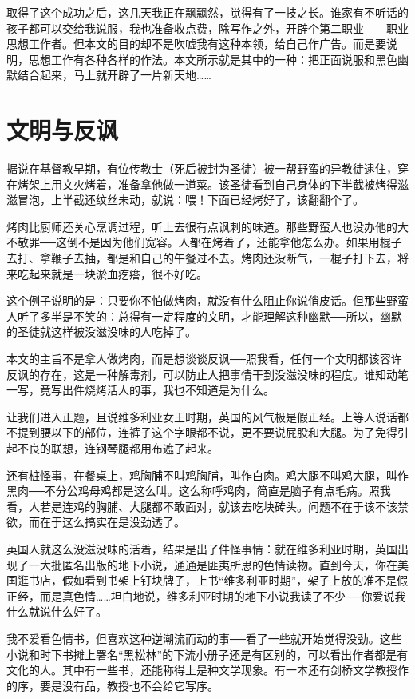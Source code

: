 取得了这个成功之后，这几天我正在飘飘然，觉得有了一技之长。谁家有不听话的孩子都可以交给我说服，我也准备收点费，除写作之外，开辟个第二职业——职业思想工作者。但本文的目的却不是吹嘘我有这种本领，给自己作广告。而是要说明，思想工作有各种各样的作法。本文所示就是其中的一种：把正面说服和黑色幽默结合起来，马上就开辟了一片新天地……

\chapter{文明与反讽}

据说在基督教早期，有位传教士（死后被封为圣徒）被一帮野蛮的异教徒逮住，穿在烤架上用文火烤着，准备拿他做一道菜。该圣徒看到自己身体的下半截被烤得滋滋冒泡，上半截还纹丝未动，就说：喂！下面已经烤好了，该翻翻个了。 

烤肉比厨师还关心烹调过程，听上去很有点讽刺的味道。那些野蛮人也没办他的大不敬罪──这倒不是因为他们宽容。人都在烤着了，还能拿他怎么办。如果用棍子去打、拿鞭子去抽，都是和自己的午餐过不去。烤肉还没断气，一棍子打下去，将来吃起来就是一块淤血疙瘩，很不好吃。 

这个例子说明的是：只要你不怕做烤肉，就没有什么阻止你说俏皮话。但那些野蛮人听了多半是不笑的：总得有一定程度的文明，才能理解这种幽默──所以，幽默的圣徒就这样被没滋没味的人吃掉了。 

本文的主旨不是拿人做烤肉，而是想谈谈反讽──照我看，任何一个文明都该容许反讽的存在，这是一种解毒剂，可以防止人把事情干到没滋没味的程度。谁知动笔一写，竟写出件烧烤活人的事，我也不知道是为什么。 

让我们进入正题，且说维多利亚女王时期，英国的风气极是假正经。上等人说话都不提到腰以下的部位，连裤子这个字眼都不说，更不要说屁股和大腿。为了免得引起不良的联想，连钢琴腿都用布遮了起来。 

还有桩怪事，在餐桌上，鸡胸脯不叫鸡胸脯，叫作白肉。鸡大腿不叫鸡大腿，叫作黑肉──不分公鸡母鸡都是这么叫。这么称呼鸡肉，简直是脑子有点毛病。照我看，人若是连鸡的胸脯、大腿都不敢面对，就该去吃块砖头。问题不在于该不该禁欲，而在于这么搞实在是没劲透了。 

英国人就这么没滋没味的活着，结果是出了件怪事情：就在维多利亚时期，英国出现了一大批匿名出版的地下小说，通通是匪夷所思的色情读物。直到今天，你在美国逛书店，假如看到书架上钉块牌子，上书“维多利亚时期”，架子上放的准不是假正经，而是真色情……坦白地说，维多利亚时期的地下小说我读了不少──你爱说我什么就说什么好了。 

我不爱看色情书，但喜欢这种逆潮流而动的事──看了一些就开始觉得没劲。这些小说和时下书摊上署名“黑松林”的下流小册子还是有区别的，可以看出作者都是有文化的人。其中有一些书，还能称得上是种文学现象。有一本还有剑桥文学教授作的序，要是没有品，教授也不会给它写序。 

